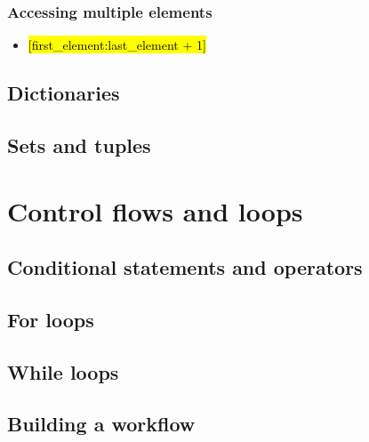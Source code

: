 \subsubsection{Accessing multiple elements}
\begin{itemize}
    \item \hl{[first_element:last_element + 1]}
\end{itemize}

\subsection{Dictionaries}
\subsection{Sets and tuples}

\section{Control flows and loops}
\subsection{Conditional statements and operators}
\subsection{For loops}
\subsection{While loops}
\subsection{Building a workflow}